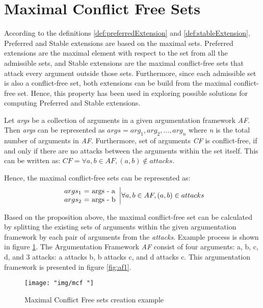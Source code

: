\section{Maximal Conflict Free Sets} \label{section:maxConflictFreeSet}
According to the definitions \ref{def:preferredExtension} and \ref{def:stableExtension}, Preferred and Stable extensions are based on the maximal sets. Preferred extensions are the maximal element with respect to the set from all the admissible sets, and Stable extensions are the maximal conflict-free sets that attack every argument outside those sets. Furthermore, since each admissible set is also a conflict-free set, both extensions can be build from the maximal conflict-free set. Hence, this property has been used in exploring possible solutions for computing Preferred and Stable extensions.

Let \textit{args} be a collection of arguments in a given argumentation framework \textit{AF}. Then \textit{args} can be represented as $args=arg_1, arg_2,...,arg_n$ where \textit{n} is the total number of arguments in \textit{AF}. 
Furthermore, set of arguments \textit{CF} is conflict-free, if and only if there are no attacks between the arguments within the set itself. This can be written as: $CF = \forall a,b \in AF, (a, b) \notin attacks$.

Hence, the maximal conflict-free sets can be represented as:
\begin{equation}
\begin{array}{lr}
args_1 $ = $ \text{args} $ - $ \text{a} \\
args_2 $ = $ \text{args} $ - $ \text{b} \\
\end{array} \bigg| \forall a, b \in AF, (a,b) \in attacks
\end{equation}

Based on the proposition above, the maximal conflict-free set can be calculated by splitting the existing sets of arguments within the given argumentation framework by each pair of arguments from the \textit{attacks}. Example process is shown in figure \ref{fig:mcfExample}. The Argumentation Framework \textit{AF} consist of four arguments: a, b, c, d, and 3 attacks: a attacks b, b attacks c, and d attacks c. This argumentation framework is presented in figure \ref{fig:af1}. 

\begin{figure}[h]
	\centering
	\texttt{[image: "img/mcf "]}
	\caption{Maximal Conflict Free sets creation example}
	\label{fig:mcfExample}
\end{figure}

